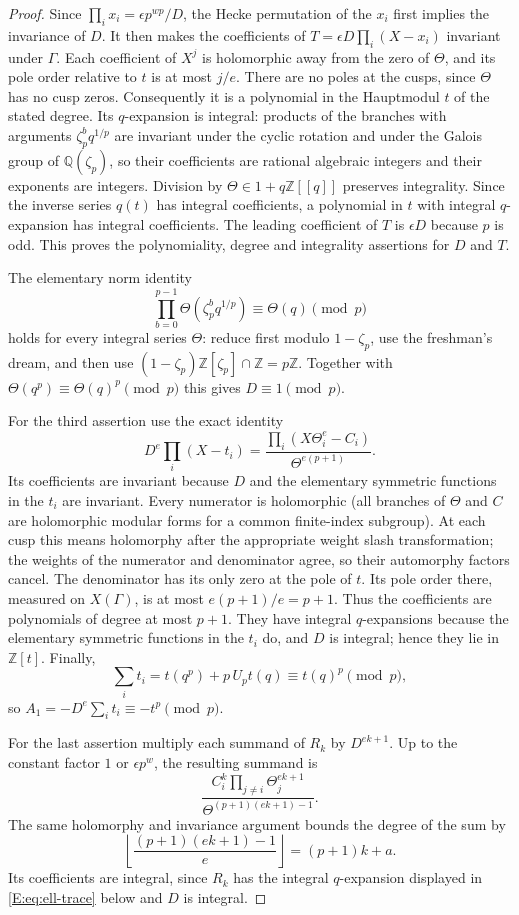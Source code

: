 \documentclass[11pt,a4paper]{article}
\theoremstyle{definition}\newtheorem{definition}[theorem]{Definition}
\theoremstyle{remark}\newtheorem{remark}[theorem]{Remark}
\numberwithin{equation}{section}
\begin{document}
\begin{proof}
Since $\prod_i x_i=\epsilon p^{wp}/D$, the Hecke permutation of the
$x_i$ first implies the invariance of $D$.  It then makes the
coefficients of $T=\epsilon D\prod_i(X-x_i)$ invariant under
$\Gamma$.  Each coefficient of $X^j$ is holomorphic away from the zero
of $\Theta$, and its pole order relative to $t$ is at most $j/e$.
There are no poles at the cusps, since $\Theta$ has no cusp zeros.
Consequently it is a polynomial in the Hauptmodul $t$ of the stated
degree.  Its $q$-expansion is integral: products of the branches with
arguments $\zeta_p^bq^{1/p}$ are invariant under the cyclic rotation and
under the Galois group of $\mathbb Q(\zeta_p)$, so their coefficients
are rational algebraic integers and their exponents are integers.
Division by $\Theta\in1+q\mathbb Z[[q]]$ preserves integrality.
Since the inverse series $q(t)$ has integral coefficients, a polynomial
in $t$ with integral $q$-expansion has integral coefficients.
The leading coefficient of $T$ is $\epsilon D$ because $p$ is odd.
This proves the polynomiality, degree and integrality assertions for
$D$ and $T$.

The elementary norm identity
\[
 \prod_{b=0}^{p-1}\Theta(\zeta_p^bq^{1/p})\equiv\Theta(q)\pmod p
\]
holds for every integral series $\Theta$: reduce first modulo
$1-\zeta_p$, use the freshman's dream, and then use
$(1-\zeta_p)\mathbb Z[\zeta_p]\cap\mathbb Z=p\mathbb Z$.
Together with $\Theta(q^p)\equiv\Theta(q)^p\pmod p$ this gives
$D\equiv1\pmod p$.

For the third assertion use the exact identity
\[
 D^e\prod_i(X-t_i)
   =\frac{\prod_i(X\Theta_i^e-C_i)}{\Theta^{e(p+1)}}.
\]
Its coefficients are invariant because $D$ and the elementary
symmetric functions in the $t_i$ are invariant.  Every numerator is
holomorphic (all branches of $\Theta$ and $C$ are holomorphic modular
forms for a common finite-index subgroup).  At each cusp this means
holomorphy after the appropriate weight slash transformation; the
weights of the numerator and denominator agree, so their automorphy
factors cancel.  The denominator has
its only zero at the pole of $t$.  Its pole order there, measured on
$X(\Gamma)$, is at most $e(p+1)/e=p+1$.  Thus the coefficients are
polynomials of degree at most $p+1$.  They have integral $q$-expansions
because the elementary symmetric functions in the $t_i$ do, and $D$
is integral; hence they lie in $\mathbb Z[t]$.  Finally,
\[
 \sum_i t_i=t(q^p)+p\,U_pt(q)\equiv t(q)^p\pmod p,
\]
so $A_1=-D^e\sum_i t_i\equiv-t^p\pmod p$.

For the last assertion multiply each summand of $R_k$ by
$D^{ek+1}$.  Up to the constant factor $1$ or $\epsilon p^w$,
the resulting summand is
\[
 \frac{C_i^k\prod_{j\ne i}\Theta_j^{ek+1}}
 {\Theta^{(p+1)(ek+1)-1}}.
\]
The same holomorphy and invariance argument bounds the degree of the
sum by
\[
 \left\lfloor\frac{(p+1)(ek+1)-1}{e}\right\rfloor
   =(p+1)k+a.
\]
Its coefficients are integral, since $R_k$ has the integral
$q$-expansion displayed in \eqref{E:eq:ell-trace} below and $D$ is integral.
\end{proof}
\end{document}

